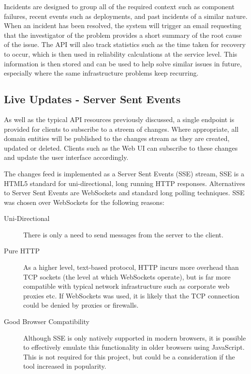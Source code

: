 \documentclass{cshonours}
\begin{document}
Incidents are designed to group all of the required context such as component failures, recent events such as deployments, and past incidents of a similar nature. When an incident has been resolved, the system will trigger an email requesting that the investigator of the problem provides a short summary of the root cause of the issue. The API will also track statistics such as the time taken for recovery to occur, which is then used in reliability calculations at the service level. This information is then stored and can be used to help solve similar issues in future, especially where the same infrastructure problems keep recurring.

\subsection{Live Updates - Server Sent Events}

As well as the typical API resources previously discussed, a single endpoint is provided for clients to subscribe to a streem of changes. Where appropriate, all domain entities will be published to the changes stream as they are created, updated or deleted. Clients such as the Web UI can subscribe to these changes and update the user interface accordingly.

The changes feed is implemented as a Server Sent Events (SSE) stream, SSE is a HTML5 standard for uni-directional, long running HTTP responses. Alternatives to Server Sent Events are WebSockets and standard long polling techniques. SSE was chosen over WebSockets for the following reasons:

\begin{description}
  \item[Uni-Directional] There is only a need to send messages from the server to the client.
  \item[Pure HTTP] As a higher level, text-based protocol, HTTP incurs more overhead than TCP sockets (the level at which WebSockets operate), but is far more compatible with typical network infrastructure such as corporate web proxies etc. If WebSockets was used, it is likely that the TCP connection could be denied by proxies or firewalls.
  \item[Good Browser Compatibility] Although SSE is only natively supported in modern browsers, it is possible to effectively emulate this functionality in older browsers using JavaScript. This is not required for this project, but could be a consideration if the tool increased in popularity.
\end{description}
\end{document}
